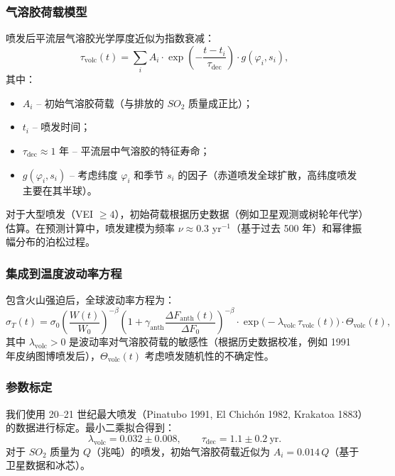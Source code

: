 \documentclass[12pt,a4paper]{article}
\begin{document}
	\subsubsection{气溶胶荷载模型}
	
	喷发后平流层气溶胶光学厚度近似为指数衰减：
	\[
	\tau_{\text{volc}}(t) = \sum_{i} A_i \cdot \exp\!\left(-\frac{t-t_i}{\tau_{\text{dec}}}\right) \cdot g(\varphi_i, s_i),
	\]
	其中：
	\begin{itemize}
		\item \(A_i\) – 初始气溶胶荷载（与排放的 \(SO_2\) 质量成正比）；
		\item \(t_i\) – 喷发时间；
		\item \(\tau_{\text{dec}} \approx 1\) 年 – 平流层中气溶胶的特征寿命；
		\item \(g(\varphi_i, s_i)\) – 考虑纬度 \(\varphi_i\) 和季节 \(s_i\) 的因子（赤道喷发全球扩散，高纬度喷发主要在其半球）。
	\end{itemize}
	
	对于大型喷发（VEI \(\ge 4\)），初始荷载根据历史数据（例如卫星观测或树轮年代学）估算。在预测计算中，喷发建模为频率 \(\nu \approx 0.3\) yr\(^{-1}\)（基于过去 500 年）和幂律振幅分布的泊松过程。
	
	\subsubsection{集成到温度波动率方程}
	
	包含火山强迫后，全球波动率方程为：
	\[
	\sigma_T(t) = \sigma_0 \left( \frac{W(t)}{W_0} \right)^{-\beta}
	\left(1 + \gamma_{\text{anth}} \frac{\Delta F_{\text{anth}}(t)}{\Delta F_0}\right)^{-\beta}
	\cdot \exp\!\bigl(-\lambda_{\text{volc}} \,\tau_{\text{volc}}(t)\bigr) \cdot \Theta_{\text{volc}}(t),
	\]
	其中 \(\lambda_{\text{volc}} > 0\) 是波动率对气溶胶荷载的敏感性（根据历史数据校准，例如 1991 年皮纳图博喷发后），\(\Theta_{\text{volc}}(t)\) 考虑喷发随机性的不确定性。
	
	\subsubsection{参数标定}
	
	我们使用 20–21 世纪最大喷发（Pinatubo 1991, El Chichón 1982, Krakatoa 1883）的数据进行标定。最小二乘拟合得到：
	\[
	\lambda_{\text{volc}} = 0.032 \pm 0.008, \qquad \tau_{\text{dec}} = 1.1 \pm 0.2\ \text{yr}.
	\]
	对于 \(SO_2\) 质量为 \(Q\)（兆吨）的喷发，初始气溶胶荷载近似为 \(A_i = 0.014\,Q\)（基于卫星数据和冰芯）。
	
\end{document}
